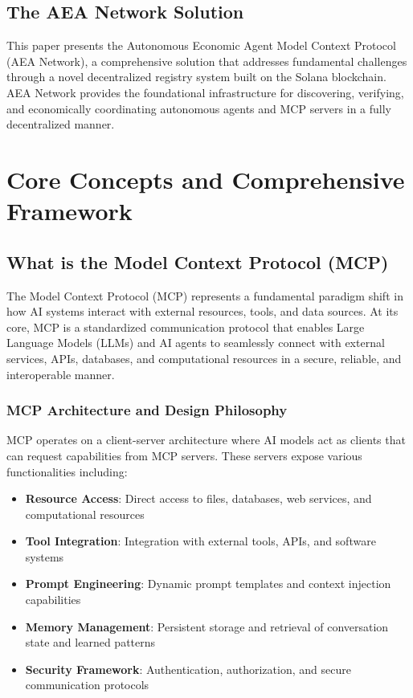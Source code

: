 \documentclass[12pt,a4paper]{article}
\begin{document}
\subsection{The AEA Network Solution}

This paper presents the Autonomous Economic Agent Model Context Protocol (AEA Network), a comprehensive solution that addresses fundamental challenges through a novel decentralized registry system built on the Solana blockchain. AEA Network provides the foundational infrastructure for discovering, verifying, and economically coordinating autonomous agents and MCP servers in a fully decentralized manner.

\section{Core Concepts and Comprehensive Framework}

\subsection{What is the Model Context Protocol (MCP)}

The Model Context Protocol (MCP) represents a fundamental paradigm shift in how AI systems interact with external resources, tools, and data sources. At its core, MCP is a standardized communication protocol that enables Large Language Models (LLMs) and AI agents to seamlessly connect with external services, APIs, databases, and computational resources in a secure, reliable, and interoperable manner.

\subsubsection{MCP Architecture and Design Philosophy}

MCP operates on a client-server architecture where AI models act as clients that can request capabilities from MCP servers. These servers expose various functionalities including:

\begin{itemize}
\item \textbf{Resource Access}: Direct access to files, databases, web services, and computational resources
\item \textbf{Tool Integration}: Integration with external tools, APIs, and software systems
\item \textbf{Prompt Engineering}: Dynamic prompt templates and context injection capabilities
\item \textbf{Memory Management}: Persistent storage and retrieval of conversation state and learned patterns
\item \textbf{Security Framework}: Authentication, authorization, and secure communication protocols
\end{itemize}
\end{document}
